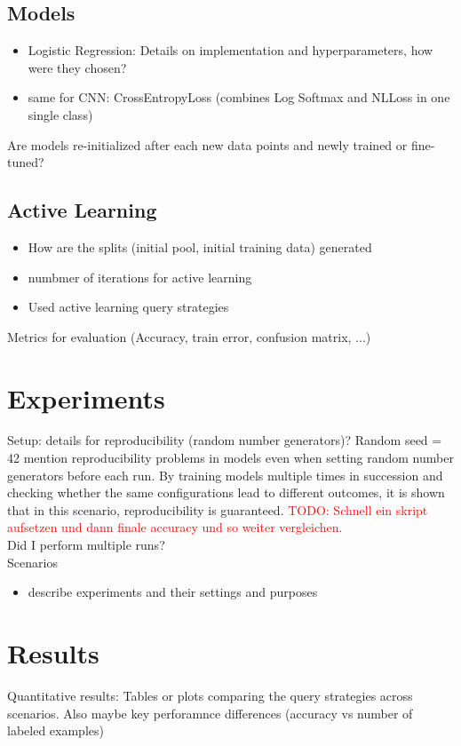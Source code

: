 \documentclass{article}
\theoremstyle{plain}
\theoremstyle{definition}
\theoremstyle{remark}
\begin{document}
\subsection{Models}
\begin{itemize}
	\item Logistic Regression: Details on implementation and hyperparameters, how were they chosen?
	\item same for CNN: CrossEntropyLoss (combines Log Softmax and NLLoss in one single class)
\end{itemize}
Are models re-initialized after each new data points and newly trained or fine-tuned?

\subsection{Active Learning}
\begin{itemize}
	\item How are the splits (initial pool, initial training data) generated
	\item numbmer of iterations for active learning
	\item Used active learning query strategies
\end{itemize}

Metrics for evaluation (Accuracy, train error, confusion matrix, ...)

\section{Experiments}\label{sec:experiments}
Setup: details for reproducibility (random number generators)?
Random seed = 42
\cite{comparableactivelearning} mention reproducibility problems in models even when setting random number generators before each run. By training models multiple times in succession and checking whether the same configurations lead to different outcomes, it is shown that in this scenario, reproducibility is guaranteed. \textcolor{red}{TODO: Schnell ein skript aufsetzen und dann finale accuracy und so weiter vergleichen.}
\\
Did I perform multiple runs?
\\

Scenarios
\begin{itemize}
	\item describe experiments and their settings and purposes
\end{itemize}

\section{Results}\label{sec:results}
Quantitative results: Tables or plots comparing the query strategies across scenarios. Also maybe key perforamnce differences (accuracy vs number of labeled examples)
\end{document}
